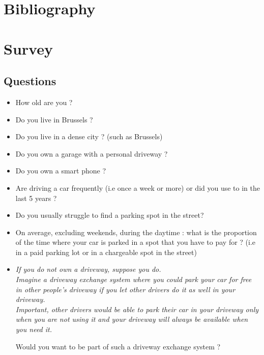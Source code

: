 \documentclass[12pt,a4paper,oneside]{book}
\begin{document}
\chapter{Bibliography}

\printbibliography[title={Article references},nottype=misc]
\pagebreak

\printbibliography[title={Other references},type=misc]



\chapter{Survey}
\section{Questions}
\begin{itemize}
\item How old are you ?
\item Do you live in Brussels ?
\item Do you live in a dense city ? (such as Brussels)
\item Do you own a garage with a personal driveway ?
\item Do you own a smart phone ?
\item Are driving a car frequently (i.e once a week or more) or did you use to in the last 5 years ?
\end{itemize}

\begin{itemize}
\item Do you usually struggle to find a parking spot in the street?
\item On average, excluding weekends, during the daytime : what is the proportion of the time where your car is parked in a spot that you have to pay for ? (i.e in a paid parking lot or in a chargeable spot in the street)
\item \textit{If you do not own a driveway, suppose you do.\\
Imagine a driveway exchange system where you could park your car for free in other people's driveway if you let other drivers do it as well in your driveway.\\
Important, other drivers would be able to park their car in your driveway only when you are not using it and your driveway will always be available when you need it.\\}

Would you want to be part of such a driveway exchange system ?
\end{itemize}
\end{document}
